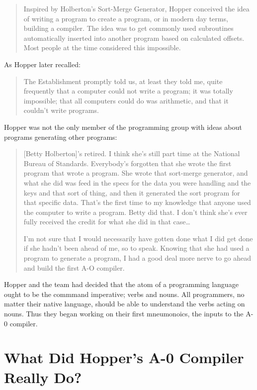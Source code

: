 \begin{quotation}
    Inspired by Holberton's Sort-Merge Generator, Hopper conceived the idea of writing a
    program to create a program, or in modern day terms, building a compiler.
    The idea was to get commonly used subroutines automatically inserted into another program based on calculated offsets.
    Most people at the time considered this impossible.
    \cite{women_in_computing_history_2002}
\end{quotation}

As Hopper later recalled:
\begin{quotation}
    The Establishment promptly told us, at least they told me, quite frequently that a
    computer could not write a program; it was totally impossible; that all computers
    could do was arithmetic, and that it couldn't write programs.
    \cite{hopl_keynote}
\end{quotation}

Hopper was not the only member of the programming group with ideas about
programs generating other programs:

\begin{quotation}
    [Betty Holberton]'s retired. I think she's still part time at the National Bureau of Standards.
    Everybody's forgotten that she wrote the first program that wrote a program. She wrote that
    sort-merge generator, and what she did was feed in the specs for the data you were handling
    and the keys and that sort of thing, and then it generated the sort program for that specific data.
    That's the first time to my knowledge that anyone used the computer to write a program. Betty
    did that. I don't think she's ever fully received the credit for what she did in that case\dots

    I'm not sure that I would necessarily have gotten done what I did get done if
    she hadn't been ahead of me, so to speak. Knowing that she had used a program
    to generate a program, I had a good deal more nerve to go ahead and build the
    first A-O compiler.
\end{quotation}

Hopper and the team had decided that the atom of a programming language ought
to be the commmand imperative; verbs and nouns. All programmers, no matter
their native language, should be able to understand the verbs acting on nouns.
Thus they began working on their first mneumonoics, the inputs to the A-0
compiler.

\section{What Did Hopper's A-0 Compiler Really Do?}


